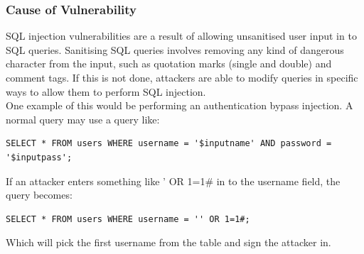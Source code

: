 \documentclass{report}
\begin{document}
\subsubsection{Cause of Vulnerability}
SQL injection vulnerabilities are a result of allowing unsanitised user input in to SQL queries. Sanitising SQL queries involves removing any kind of dangerous character from the input, such as quotation marks (single and double) and comment tags. If this is not done, attackers are able to modify queries in specific ways to allow them to perform SQL injection.\\
One example of this would be performing an authentication bypass injection. A normal query may use a query like:
\begin{verbatim}
SELECT * FROM users WHERE username = '$inputname' AND password = 
'$inputpass';
\end{verbatim}
If an attacker enters something like ' OR 1=1\# in to the username field, the query becomes:
\begin{verbatim}
SELECT * FROM users WHERE username = '' OR 1=1#;
\end{verbatim}
Which will pick the first username from the table and sign the attacker in.
\end{document}
